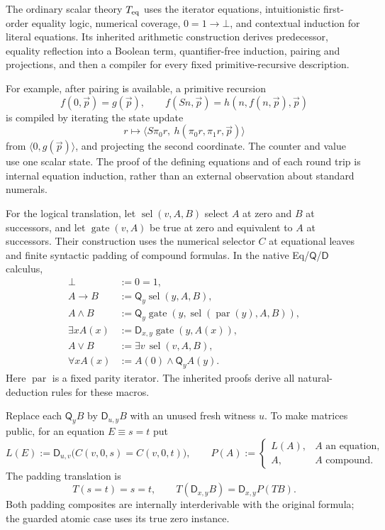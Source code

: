 \documentclass[11pt,letterpaper]{article}
\theoremstyle{definition}\newtheorem{definition}[theorem]{Definition}
\theoremstyle{remark}\newtheorem{remark}[theorem]{Remark}
\newcommand{\Q}{\mathsf Q}
\newcommand{\D}{\mathsf D}
\begin{document}
The ordinary scalar theory $T_{\rm eq}$ uses the iterator equations,
intuitionistic first-order equality logic, numerical coverage,
$0=1\to\bot$, and contextual induction for literal equations. Its inherited
arithmetic construction derives predecessor, equality reflection into a
Boolean term, quantifier-free induction, pairing and projections, and then
a compiler for every fixed primitive-recursive description.\cite{foundations,lean}

For example, after pairing is available, a primitive recursion
\[
 f(0,\vec p)=g(\vec p),\qquad
 f(Sn,\vec p)=h(n,f(n,\vec p),\vec p)
\]
is compiled by iterating the state update
\[
 r\longmapsto
 \langle S\pi_0r,\ h(\pi_0r,\pi_1r,\vec p)\rangle
\]
from $\langle0,g(\vec p)\rangle$, and projecting the second coordinate.
The counter and value use one scalar state. The proof of the defining
equations and of each round trip is internal equation induction, rather
than an external observation about standard numerals.

For the logical translation, let $\operatorname{sel}(v,A,B)$ select $A$
at zero and $B$ at successors, and let $\operatorname{gate}(v,A)$ be true
at zero and equivalent to $A$ at successors. Their construction uses
the numerical selector $C$ at equational leaves and finite syntactic
padding of compound formulas. In the native Eq/$\Q$/$\D$ calculus,
\[
\begin{aligned}
 \bot&:=0=1,\\
 A\to B&:=\Q_y\operatorname{sel}(y,A,B),\\
 A\wedge B&:=\Q_y\operatorname{gate}
      (y,\operatorname{sel}(\operatorname{par}(y),A,B)),\\
 \exists x A(x)&:=\D_{x,y}\operatorname{gate}(y,A(x)),\\
 A\vee B&:=\exists v\,\operatorname{sel}(v,A,B),\\
 \forall x A(x)&:=A(0)\wedge\Q_y A(y).
\end{aligned}
\]
Here $\operatorname{par}$ is a fixed parity iterator. The inherited proofs
derive all natural-deduction rules for these macros.

Replace each $\Q_yB$ by $\D_{u,y}B$ with an unused fresh witness $u$.
To make matrices public, for an equation $E\equiv s=t$ put
\[
 L(E):=\D_{u,v}\bigl(C(v,0,s)=C(v,0,t)\bigr),
 \qquad
 P(A):=\begin{cases}L(A),&A\text{ an equation},\\A,&A\text{ compound}.
 \end{cases}
\]
The padding translation is
\[
 T(s=t)=s=t,\qquad T(\D_{x,y}B)=\D_{x,y}P(TB).
\]
Both padding composites are internally interderivable with the original
formula; the guarded atomic case uses its true zero instance.
\end{document}
